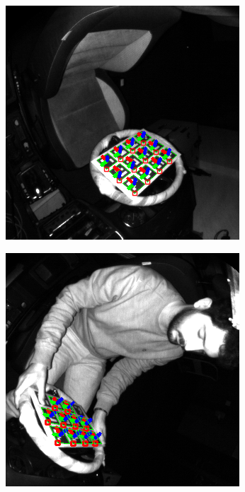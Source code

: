 \begin{figure}[htpb]
    \centering
    \begin{subfigure}[t]{0.23\textwidth}
        \centering
        \includegraphics[width=\textwidth]{media/chapter 5/aruco_board_estimation0.png}
    \end{subfigure}\hfill
    \begin{subfigure}[t]{0.23\textwidth}
        \centering
        \includegraphics[width=\textwidth]{media/chapter 5/aruco_board_estimation1.png}

\end{subfigure}
\end{figure}
